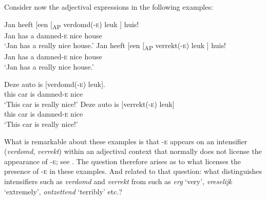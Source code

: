 \documentclass[output=paper]{langsci/langscibook}
\begin{document}
Consider now the adjectival expressions in the following examples:

\ea%
    \label{ex:18.58}
	\ea
	\gll  Jan  heeft    [een    [\textsubscript{AP}  verdomd(\textsc{-e})  leuk ]    huis!\\
		Jan    has        a         {}       damned-\textsc{e}      nice {}   house\\
	\glt \enquote*{Jan has a really nice house.}
	\ex
	\gll  Jan  heeft  [een    [\textsubscript{AP}  verrekt(\textsc{-e})  leuk ]  huis!\\
    Jan    has      a      {}          damned-\textsc{e}    nice {} house\\
	\glt \enquote*{Jan has a really nice house.}
	\z
\z

\ea%
    \label{ex:18.59}
	\ea
	\gll Deze    auto    is    [verdomd(\textsc{-e})  leuk].\\
		this      car      is    damned-\textsc{e}        nice\\
	\glt \enquote*{This car is really nice!}
	\ex
	\gll Deze    auto    is    [verrekt(\textsc{-e})    leuk]\\
		this      car      is    damned-\textsc{e}      nice\\
	\glt \enquote*{This car is really nice!}
	\z
\z

What is remarkable about these examples is that \textsc{-e} appears on an
intensifier (\emph{verdomd}, \emph{verrekt}) within an adjectival context that
normally does not license the appearance of \textsc{-e}; see .
The question therefore arises as to what licenses the presence of \textsc{-e}
in these examples. And related to that question: what distinguishes
intensifiers such as \emph{verdomd} and \emph{verrekt} from  such
as \emph{erg} \enquote*{very}, \emph{vreselijk} \enquote*{extremely},
\emph{ontzettend} \enquote*{terribly} etc.?
\end{document}
